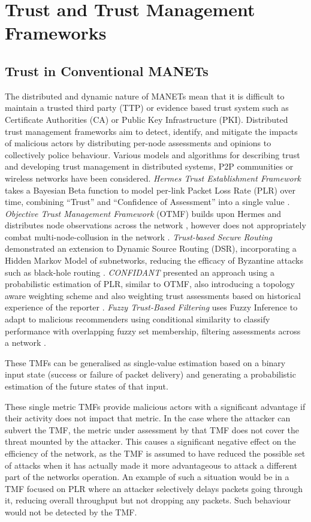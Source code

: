 \documentclass[conference]{IEEEtran}
\begin{document}
\section{Trust and Trust Management Frameworks}\label{sec:trustandtmfs}


\subsection{Trust in Conventional MANETs}\label{sec:trustinmanets}

The distributed and dynamic nature of MANETs mean that it is difficult to maintain a trusted third party (TTP) or evidence based trust system such as Certificate Authorities (CA) or Public Key Infrastructure (PKI).
Distributed trust management frameworks aim to detect, identify, and mitigate the impacts of malicious actors by distributing per-node assessments and opinions to collectively police behaviour.
Various models and algorithms for describing trust and developing trust management in distributed systems, P2P communities or wireless networks have been considered.
\emph{Hermes Trust Establishment Framework} takes a Bayesian Beta function to model per-link Packet Loss Rate (PLR) over time, combining ``Trust'' and ``Confidence of Assessment'' into a single value \cite{Zouridaki2005}.
\emph{Objective Trust Management Framework} (OTMF) builds upon Hermes and distributes node observations across the network \cite{Li2008}, however does not appropriately combat multi-node-collusion in the network \cite{Cho2011}.
\emph{Trust-based Secure Routing} demonstrated an extension to Dynamic Source Routing (DSR), incorporating a Hidden Markov Model of subnetworks, reducing the efficacy of Byzantine attacks such as black-hole routing  \cite{Moe2008a}.
\emph{CONFIDANT} presented an approach using a probabilistic estimation of PLR, similar to OTMF, also introducing a topology aware weighting scheme and also weighting trust assessments based on historical experience of the reporter \cite{Buchegger2002}.
\emph{Fuzzy Trust-Based Filtering} uses Fuzzy Inference to adapt to malicious recommenders using conditional similarity to classify performance with overlapping fuzzy set membership, filtering assessments across a network \cite{Luo2008}. 

These TMFs can be generalised as single-value estimation based on a binary input state (success or failure of packet delivery) and generating a probabilistic estimation of the future states of that input. 

These single metric TMFs provide malicious actors with a significant advantage if their activity does not impact that metric.
In the case where the attacker can subvert the TMF, the metric under assessment by that TMF does not cover the threat mounted by the attacker.
This causes a significant negative effect on the efficiency of the network, as the TMF is assumed to have reduced the possible set of attacks when it has actually made it more advantageous to attack a different part of the networks operation.
An example of such a situation would be in a TMF focused on PLR where an attacker selectively delays packets going through it, reducing overall throughput but not dropping any packets.
Such behaviour would not be detected by the TMF.
\end{document}
